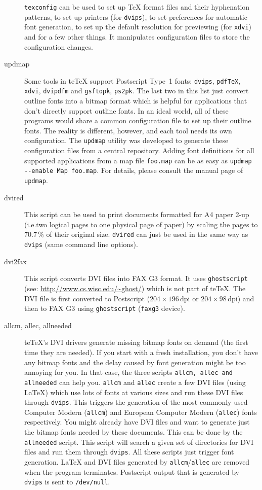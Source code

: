 \documentclass[11pt,a4paper]{article}
\newcommand{\teTeX}{\textrm{te}\TeX\xspace}
\begin{document}
\begin{description}
  \verb+texconfig+ can be used to set up \TeX{} format files and their
  hyphenation patterns, to set up printers (for \verb+dvips+), to set
  preferences for automatic font generation, to set up the default
  resolution for previewing (for \verb+xdvi+) and for a few other
  things.  It manipulates configuration files to store the
  configuration changes.
\item[updmap] Some tools in \teTeX{} support Postscript Type~1
  fonts: \texttt{dvips}, \texttt{pdf\TeX}, \texttt{xdvi},
  \texttt{dvipdfm} and \texttt{gsftopk}, \texttt{ps2pk}. The last two
  in this list just convert outline fonts into a bitmap format which
  is helpful for applications that don't directly support outline
  fonts. In an ideal world, all of these programs would share a common
  configuration file to set up their outline fonts. The reality is
  different, however, and each tool needs its own configuration. The
  \texttt{updmap} utility was developed to generate these
  configuration files from a central repository. Adding font
  definitions for all supported applications from a map file
  \texttt{foo.map} can be as easy as %
  \verb+updmap --enable Map foo.map+. For details, please consult the
  manual page of \texttt{updmap}.
\item[dvired] This script can be used to print documents formatted for
  A4 paper 2-up (i.e.\@ two logical pages to one physical page of
  paper) by scaling the pages to 70.7\,\% of their original size.
  \texttt{dvired} can just be used in the same way as \texttt{dvips}
  (same command line options).
\item[dvi2fax] This script converts DVI files into FAX G3 format. It
  uses \texttt{ghostscript} (see:
  \url{http://www.cs.wisc.edu/~ghost/}) which is not part of \teTeX{}.
  The DVI file is first converted to Postscript ($204\times 196$\,dpi
  or $204\times 98$\,dpi) and then to FAX G3 using
  \texttt{ghostscript} (\texttt{faxg3} device).
\item[allcm, allec, allneeded] \teTeX's DVI drivers generate missing
  bitmap fonts on demand (the first time they are needed). If you
  start with a fresh installation, you don't have any bitmap fonts and
  the delay caused by font generation might be too annoying for you.
  In that case, the three scripts \texttt{allcm, allec and allneeded}
  can help you. \texttt{allcm} and \texttt{allec} create a few DVI
  files (using \LaTeX) which use lots of fonts at various sizes and run
  these DVI files through \texttt{dvips}. This triggers the generation
  of the most commonly used Computer Modern (\texttt{allcm}) and
  European Computer Modern (\texttt{allec}) fonts respectively. You
  might already have DVI files and want to generate just the bitmap
  fonts needed by these documents. This can be done by the
  \texttt{allneeded} script.  This script will search a given set of
  directories for DVI files and run them through \texttt{dvips}. All
  these scripts just trigger font generation. \LaTeX{} and DVI files
  generated by \texttt{allcm}/\texttt{allec} are removed when the
  program terminates. Postscript output that is generated by
  \texttt{dvips} is sent to \texttt{/dev/null}.
  

\end{description}
\end{document}
